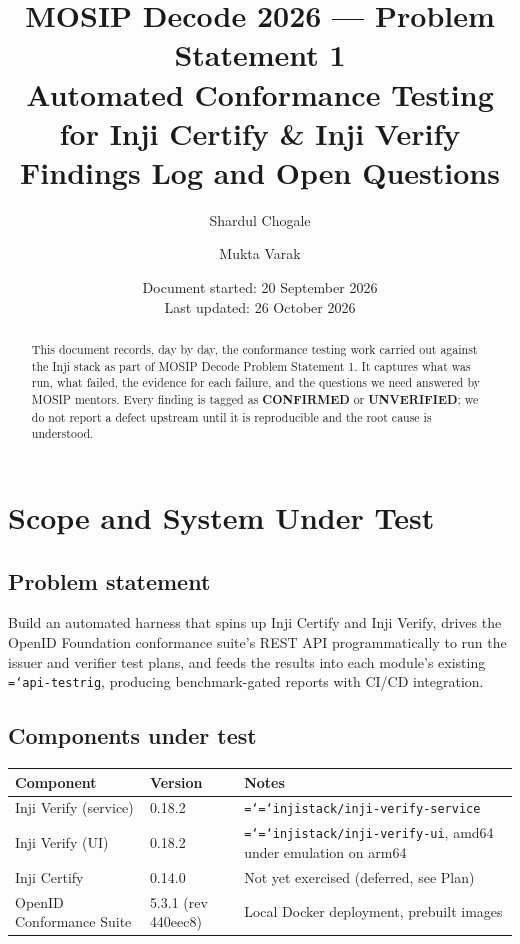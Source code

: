 \documentclass[11pt,a4paper]{article}
\title{\textbf{MOSIP Decode 2026 --- Problem Statement 1}\\[0.3em]
\large Automated Conformance Testing for Inji Certify \& Inji Verify\\[0.8em]
\normalsize Findings Log and Open Questions}
\author{Shardul Chogale \and Mukta Varak}
\date{Document started: 20 September 2026\\Last updated: 26 October 2026}
\newcommand{\confirmed}{\textcolor{sev-low}{\textbf{CONFIRMED}}}
\newcommand{\unverified}{\textcolor{sev-med}{\textbf{UNVERIFIED}}}
\let\origtexttt\texttt
\renewcommand{\texttt}[1]{\origtexttt{\hyphenchar\font=`\-\relax #1}}
\renewcommand{\_}{\textunderscore\allowbreak}
\begin{document}
\maketitle
\thispagestyle{fancy}

\begin{abstract}
\noindent This document records, day by day, the conformance testing work carried out
against the Inji stack as part of MOSIP Decode Problem Statement 1. It captures what was
run, what failed, the evidence for each failure, and the questions we need answered by
MOSIP mentors. Every finding is tagged as \confirmed{} or \unverified{}; we do not report
a defect upstream until it is reproducible and the root cause is understood.
\end{abstract}

\tableofcontents
\newpage

\section{Scope and System Under Test}

\subsection*{Problem statement}
Build an automated harness that spins up Inji Certify and Inji Verify, drives the OpenID
Foundation conformance suite's REST API programmatically to run the issuer and verifier
test plans, and feeds the results into each module's existing \texttt{api-testrig},
producing benchmark-gated reports with CI/CD integration.

\subsection*{Components under test}
\begin{longtable}{p{4.5cm} p{4cm} p{6cm}}
\hline
\textbf{Component} & \textbf{Version} & \textbf{Notes}\\
\hline
\endhead
Inji Verify (service) & 0.18.2 & \texttt{injistack/inji-verify-service}\\
Inji Verify (UI) & 0.18.2 & \texttt{injistack/inji-verify-ui}, amd64 under emulation on arm64\\
Inji Certify & 0.14.0 & Not yet exercised (deferred, see Plan)\\
OpenID Conformance Suite & 5.3.1 (rev 440eec8) & Local Docker deployment, prebuilt images\\
\hline
\end{longtable}
\end{document}
